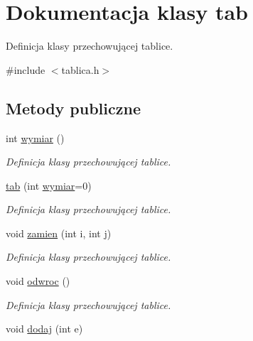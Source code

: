 \hypertarget{classtab}{\section{\-Dokumentacja klasy tab}
\label{classtab}
}


\-Definicja klasy przechowującej tablice.  




{\ttfamily \#include $<$tablica.\-h$>$}

\subsection*{\-Metody publiczne}
\begin{DoxyCompactItemize}
\item 
\hypertarget{classtab_ae9a39f118e9d520422a702f34a02a6d4}{int \hyperlink{classtab_ae9a39f118e9d520422a702f34a02a6d4}{wymiar} ()}\label{classtab_ae9a39f118e9d520422a702f34a02a6d4}

\begin{DoxyCompactList}\small\item\em \-Definicja klasy przechowującej tablice. \end{DoxyCompactList}\item 
\hypertarget{classtab_a62ce94ba44cb1cad08a795a6e694379f}{\hyperlink{classtab_a62ce94ba44cb1cad08a795a6e694379f}{tab} (int \hyperlink{classtab_ae9a39f118e9d520422a702f34a02a6d4}{wymiar}=0)}\label{classtab_a62ce94ba44cb1cad08a795a6e694379f}

\begin{DoxyCompactList}\small\item\em \-Definicja klasy przechowującej tablice. \end{DoxyCompactList}\item 
\hypertarget{classtab_aa6b0961d15e5ad55f4dc84d5ca0f693b}{void \hyperlink{classtab_aa6b0961d15e5ad55f4dc84d5ca0f693b}{zamien} (int i, int j)}\label{classtab_aa6b0961d15e5ad55f4dc84d5ca0f693b}

\begin{DoxyCompactList}\small\item\em \-Definicja klasy przechowującej tablice. \end{DoxyCompactList}\item 
\hypertarget{classtab_ac618d6a3d5e17cd6afb0ba5c225f4416}{void \hyperlink{classtab_ac618d6a3d5e17cd6afb0ba5c225f4416}{odwroc} ()}\label{classtab_ac618d6a3d5e17cd6afb0ba5c225f4416}

\begin{DoxyCompactList}\small\item\em \-Definicja klasy przechowującej tablice. \end{DoxyCompactList}\item 
\hypertarget{classtab_ae6e506c6264acf4367f6927624e3fed0}{void \hyperlink{classtab_ae6e506c6264acf4367f6927624e3fed0}{dodaj} (int e)}\label{classtab_ae6e506c6264acf4367f6927624e3fed0}


\end{DoxyCompactItemize}

